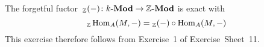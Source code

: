 \section{}

The forgetful fuctor~${}_{\mathbb{Z}}(-) \colon \text{$k$-$\mathbf{Mod}$} \to \text{$\mathbb{Z}$-$\mathbf{Mod}$}$ is exact with
\[
  {}_{\mathbb{Z}} \operatorname{Hom}_A(M,-)
  =
  {}_{\mathbb{Z}} (-) \circ \operatorname{Hom}_A(M,-)
\]
This exercise therefore follows from Exercise~1 of Exercise~Sheet~11.




